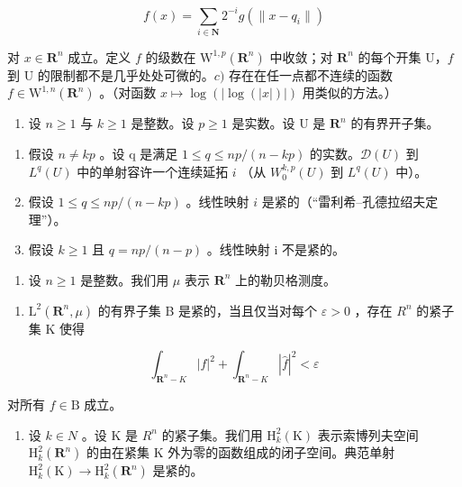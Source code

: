 \[
f (x) = \sum_ {i \in \mathbf {N}} 2 ^ {- i} g (\| x - q _ {i} \|)
\]

对 \(x \in \mathbf{R}^n\) 成立。定义 \(f\) 的级数在 \(\mathrm{W}^{1,p}(\mathbf{R}^n)\) 中收敛；对 \(\mathbf{R}^n\) 的每个开集 U，\(f\) 到 U 的限制都不是几乎处处可微的。\(c)\) 存在在任一点都不连续的函数 \(f \in \mathrm{W}^{1,n}(\mathbf{R}^n)\) 。（对函数 \(x \mapsto \log(|\log(|x|)|)\) 用类似的方法。）

\begin{enumerate}
\def\labelenumi{\arabic{enumi})}
\setcounter{enumi}{15}
\tightlist
\item
  设 \(n \geqslant 1\) 与 \(k \geqslant 1\) 是整数。设 \(p \geqslant 1\) 是实数。设 U 是 \(\mathbf{R}^n\) 的有界开子集。
\end{enumerate}

\begin{enumerate}
\def\labelenumi{\alph{enumi})}
\item
  假设 \(n \neq kp\) 。设 q 是满足 \(1 \leqslant q \leqslant np/(n-kp)\) 的实数。\(\mathcal{D}(U)\) 到 \(L^{q}(U)\) 中的单射容许一个连续延拓 \(i\) （从 \(W_{0}^{k,p}(U)\) 到 \(L^{q}(U)\) 中）。
\item
  假设 \(1 \leqslant q \leqslant np/(n-kp)\) 。线性映射 \(i\) 是紧的（“雷利希–孔德拉绍夫定理”）。
\item
  假设 \(k \geqslant 1\) 且 \(q = np/(n - p)\) 。线性映射 i 不是紧的。
\end{enumerate}

\begin{enumerate}
\def\labelenumi{\arabic{enumi})}
\setcounter{enumi}{16}
\tightlist
\item
  设 \(n \geqslant 1\) 是整数。我们用 \(\mu\) 表示 \(\mathbf{R}^n\) 上的勒贝格测度。
\end{enumerate}

\begin{enumerate}
\def\labelenumi{\alph{enumi})}
\tightlist
\item
  \(\mathrm{L}^{2}(\mathbf{R}^{n},\mu)\) 的有界子集 B 是紧的，当且仅当对每个 \(\varepsilon>0\) ，存在 \(R^{n}\) 的紧子集 K 使得
\end{enumerate}

\[
\int_ {\mathbf {R} ^ {n} - K} | f | ^ {2} + \int_ {\mathbf {R} ^ {n} - K} | \widehat {f} | ^ {2} <   \varepsilon
\]

对所有 \(f\in \mathrm{B}\) 成立。

\begin{enumerate}
\def\labelenumi{\alph{enumi})}
\setcounter{enumi}{1}
\tightlist
\item
  设 \(k \in N\) 。设 K 是 \(R^{n}\) 的紧子集。我们用 \(\mathrm{H}_{k}^{2}(\mathrm{K})\) 表示索博列夫空间 \(\mathrm{H}_{k}^{2}(\mathbf{R}^{n})\) 的由在紧集 K 外为零的函数组成的闭子空间。典范单射 \(\mathrm{H}_{k}^{2}(\mathrm{K}) \to \mathrm{H}_{k}^{2}(\mathbf{R}^{n})\) 是紧的。
\end{enumerate}

